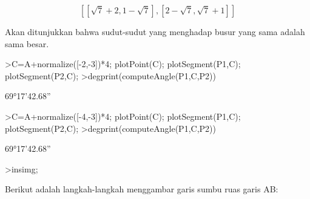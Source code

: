 \documentclass{article}
\begin{document}
\begin{eulernotebook}
\begin{euleroutput}
\end{euleroutput}
\begin{eulerformula}
\[
\left[ \left[ \sqrt{7}+2 , 1-\sqrt{7} \right]  , \left[ 2-\sqrt{7}   , \sqrt{7}+1 \right]  \right] 
\]
\end{eulerformula}
\begin{eulercomment}
Akan ditunjukkan bahwa sudut-sudut yang menghadap busur yang sama
adalah sama besar.
\end{eulercomment}
\begin{eulerprompt}
>C=A+normalize([-2,-3])*4; plotPoint(C); plotSegment(P1,C); plotSegment(P2,C);
>degprint(computeAngle(P1,C,P2))
\end{eulerprompt}
\begin{euleroutput}
  69°17'42.68''
\end{euleroutput}
\begin{eulerprompt}
>C=A+normalize([-4,-3])*4; plotPoint(C); plotSegment(P1,C); plotSegment(P2,C);
>degprint(computeAngle(P1,C,P2))
\end{eulerprompt}
\begin{euleroutput}
  69°17'42.68''
\end{euleroutput}
\begin{eulerprompt}
>insimg;
\end{eulerprompt}
\begin{eulercomment}
Berikut adalah langkah-langkah menggambar garis sumbu ruas garis AB:


\end{eulercomment}
\end{eulernotebook}
\end{document}
